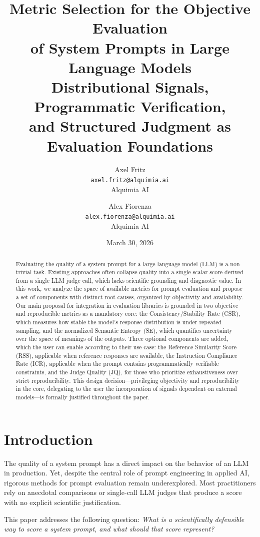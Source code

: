 \documentclass[11pt,a4paper]{article}
\title{
    \vspace{-1cm}
    \textbf{Metric Selection for the Objective Evaluation\\
    of System Prompts in Large Language Models}\\
    \vspace{0.4cm}
    \large Distributional Signals, Programmatic Verification,\\
    and Structured Judgment as Evaluation Foundations
}
\author{
    Axel Fritz\\
    \texttt{axel.fritz@alquimia.ai}\\
    Alquimia AI
    \and
    Alex Fiorenza\\
    \texttt{alex.fiorenza@alquimia.ai}\\
    Alquimia AI
}
\date{March 30, 2026}
\begin{document}
\maketitle

\begin{abstract}
Evaluating the quality of a system prompt for a large language model (LLM) is a non-trivial task. Existing approaches often collapse quality into a single scalar score derived from a single LLM judge call, which lacks scientific grounding and diagnostic value. In this work, we analyze the space of available metrics for prompt evaluation and propose a set of components with distinct root causes, organized by objectivity and availability. Our main proposal for integration in evaluation libraries is grounded in two objective and reproducible metrics as a mandatory core: the Consistency/Stability Rate (CSR), which measures how stable the model's response distribution is under repeated sampling, and the normalized Semantic Entropy (SE), which quantifies uncertainty over the space of meanings of the outputs. Three optional components are added, which the user can enable according to their use case: the Reference Similarity Score (RSS), applicable when reference responses are available, the Instruction Compliance Rate (ICR), applicable when the prompt contains programmatically verifiable constraints, and the Judge Quality (JQ), for those who prioritize exhaustiveness over strict reproducibility. This design decision—privileging objectivity and reproducibility in the core, delegating to the user the incorporation of signals dependent on external models—is formally justified throughout the paper.
\end{abstract}

\section{Introduction}

The quality of a system prompt has a direct impact on the behavior of an LLM in production. Yet, despite the central role of prompt engineering in applied AI, rigorous methods for prompt evaluation remain underexplored. Most practitioners rely on anecdotal comparisons or single-call LLM judges that produce a score with no explicit scientific justification.

This paper addresses the following question: \textit{What is a scientifically defensible way to score a system prompt, and what should that score represent?}
\end{document}

